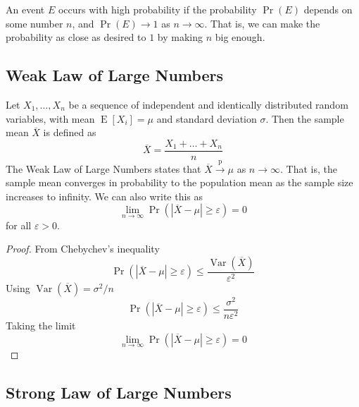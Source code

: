 \documentclass[11pt]{report} %
\begin{document}
An event $E$ occurs with high probability if the probability $\operatorname{Pr}\left(E\right)$ depends on some number $n$, and $\operatorname{Pr}\left(E\right) \to 1$ as $n \to \infty$. That is, we can make the probability as close as desired to $1$ by making $n$ big enough.

\subsection{Weak Law of Large Numbers}

Let $X_{1}, \dots, X_{n}$ be a sequence of independent and identically distributed random variables, with mean $\operatorname{E}\left[X_{i}\right] = \mu$ and standard deviation $\sigma$. Then the sample mean $\overline{X}$ is defined as
\begin{equation}
\overline{X} = \dfrac{X_{1} + \dots + X_{n}}{n}
\end{equation}
The Weak Law of Large Numbers states that $\overline{X} \overset{\mathrm{p}}{\rightarrow} \mu$ as $n \rightarrow \infty$. That is, the sample mean converges in probability to the population mean as the sample size increases to infinity. We can also write this as
\begin{equation}
\lim_{n\rightarrow\infty}\operatorname{Pr}\left(\left|\overline{X} - \mu\right|\geq \varepsilon \right) = 0
\end{equation}
for all $\varepsilon > 0$.
\begin{proof}
From Chebychev's inequality
\begin{equation}
\operatorname{Pr}\left(\left|\overline{X} - \mu\right| \geq \varepsilon\right) \leq \dfrac{\operatorname{Var}\left(\overline{X}\right)}{\varepsilon^{2}}
\end{equation}
Using $\operatorname{Var}\left(\overline{X}\right) = \sigma^{2}/n$
\begin{equation}
\operatorname{Pr}\left(\left|\overline{X} - \mu\right| \geq \varepsilon\right) \leq \dfrac{\sigma^{2}}{n\varepsilon^{2}}
\end{equation}
Taking the limit
\begin{equation}
\lim_{n\rightarrow\infty}\operatorname{Pr}\left(\left|\overline{X} - \mu\right|\geq \varepsilon \right) = 0
\end{equation}
\end{proof}

\subsection{Strong Law of Large Numbers}
\end{document}
